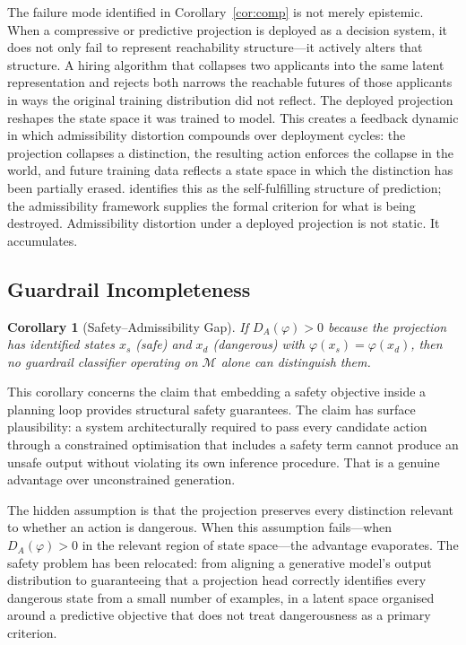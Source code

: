 \documentclass[11pt, a4paper]{article}
\theoremstyle{plain}
\newtheorem{corollary}{Corollary}
\theoremstyle{definition}
\theoremstyle{remark}
\newcommand{\DA}{D_A(\varphi)}
\begin{document}
The failure mode identified in Corollary~\ref{cor:comp} is not merely epistemic.
When a compressive or predictive projection is deployed as a decision system, it
does not only fail to represent reachability structure---it actively alters that
structure. A hiring algorithm that collapses two applicants into the same latent
representation and rejects both narrows the reachable futures of those applicants
in ways the original training distribution did not reflect. The deployed projection
reshapes the state space it was trained to model. This creates a feedback dynamic
in which admissibility distortion compounds over deployment cycles: the projection
collapses a distinction, the resulting action enforces the collapse in the world,
and future training data reflects a state space in which the distinction has been
partially erased. \citet{veliz2024prophecy} identifies this as the self-fulfilling
structure of prediction; the admissibility framework supplies the formal criterion
for what is being destroyed. Admissibility distortion under a deployed projection
is not static. It accumulates.

\subsection{Guardrail Incompleteness}

\begin{corollary}[Safety--Admissibility Gap]
\label{cor:safety}
If $\DA > 0$ because the projection has identified states $x_s$ (safe) and
$x_d$ (dangerous) with $\varphi(x_s) = \varphi(x_d)$, then no guardrail
classifier operating on $\mathcal{M}$ alone can distinguish them.
\end{corollary}

This corollary concerns the claim that embedding a safety objective inside a
planning loop provides structural safety guarantees. The claim has surface
plausibility: a system architecturally required to pass every candidate action
through a constrained optimisation that includes a safety term cannot produce
an unsafe output without violating its own inference procedure. That is a genuine
advantage over unconstrained generation.

The hidden assumption is that the projection preserves every distinction relevant
to whether an action is dangerous. When this assumption fails---when $\DA > 0$
in the relevant region of state space---the advantage evaporates. The safety
problem has been relocated: from aligning a generative model's output distribution
to guaranteeing that a projection head correctly identifies every dangerous state
from a small number of examples, in a latent space organised around a predictive
objective that does not treat dangerousness as a primary criterion.
\end{document}
